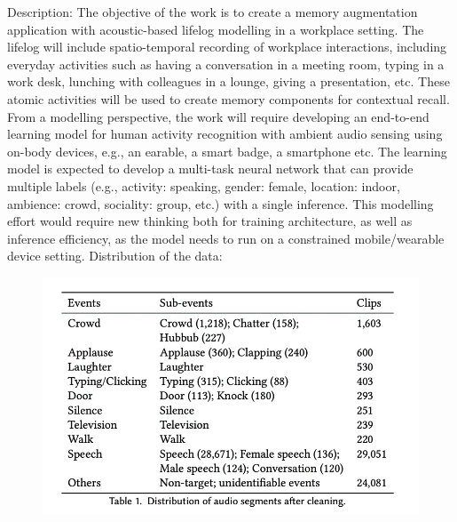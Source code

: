 	Description:
The objective of the work is to create a memory augmentation application with acoustic-based lifelog modelling in a workplace setting. The lifelog will include spatio-temporal recording of workplace interactions, including everyday activities such as having a conversation in a meeting room, typing in a work desk, lunching with colleagues in a lounge,  giving a presentation, etc. These atomic activities will be used to create memory components for contextual recall. 
From a modelling perspective, the work will require developing an end-to-end learning model for human activity recognition with ambient audio sensing using on-body devices, e.g., an earable, a smart badge, a smartphone etc. The learning model is expected to develop a multi-task neural network that can provide multiple labels (e.g., activity: speaking, gender: female,  location: indoor,  ambience: crowd, sociality: group, etc.) with a single inference. This modelling effort would require new thinking both for training architecture, as well as inference efficiency, as the model needs to run on a constrained mobile/wearable device setting.
Distribution of the data:

\begin{figure}
	\centering
	\includegraphics[width=0.7\linewidth]{screenshot001}
	\caption{}
	\label{fig:screenshot001}
\end{figure}

